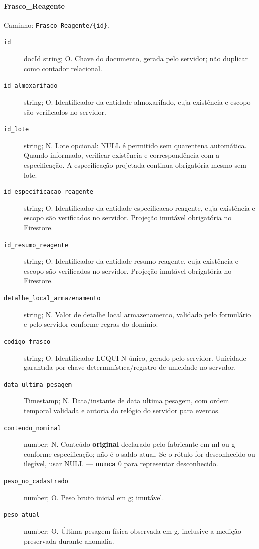 \paragraph{Frasco\_Reagente}\mbox{}\par
Caminho: \texttt{Frasco\_Reagente/\{id\}}.
\begin{description}
\item[\texttt{id}] docId string; O. Chave do documento, gerada pelo servidor; não duplicar como contador relacional.
\item[\texttt{id\_almoxarifado}] string; O. Identificador da entidade almoxarifado, cuja existência e escopo são verificados no servidor.
\item[\texttt{id\_lote}] string; N. Lote opcional: NULL é permitido sem quarentena automática. Quando informado, verificar existência e correspondência com a especificação. A especificação projetada continua obrigatória mesmo sem lote.
\item[\texttt{id\_especificacao\_reagente}] string; O. Identificador da entidade especificacao reagente, cuja existência e escopo são verificados no servidor. Projeção imutável obrigatória no Firestore.
\item[\texttt{id\_resumo\_reagente}] string; O. Identificador da entidade resumo reagente, cuja existência e escopo são verificados no servidor. Projeção imutável obrigatória no Firestore.
\item[\texttt{detalhe\_local\_armazenamento}] string; N. Valor de detalhe local armazenamento, validado pelo formulário e pelo servidor conforme regras do domínio.
\item[\texttt{codigo\_frasco}] string; O. Identificador LCQUI-N único, gerado pelo servidor. Unicidade garantida por chave determinística/registro de unicidade no servidor.
\item[\texttt{data\_ultima\_pesagem}] Timestamp; N. Data/instante de data ultima pesagem, com ordem temporal validada e autoria do relógio do servidor para eventos.
\item[\texttt{conteudo\_nominal}] number; N. Conteúdo \textbf{original} declarado pelo fabricante em ml ou g conforme especificação; não é o saldo atual. Se o rótulo for desconhecido ou ilegível, usar NULL --- \textbf{nunca} 0 para representar desconhecido.
\item[\texttt{peso\_no\_cadastrado}] number; O. Peso bruto inicial em g; imutável.
\item[\texttt{peso\_atual}] number; O. Última pesagem física observada em g, inclusive a medição preservada durante anomalia.

\end{description}
